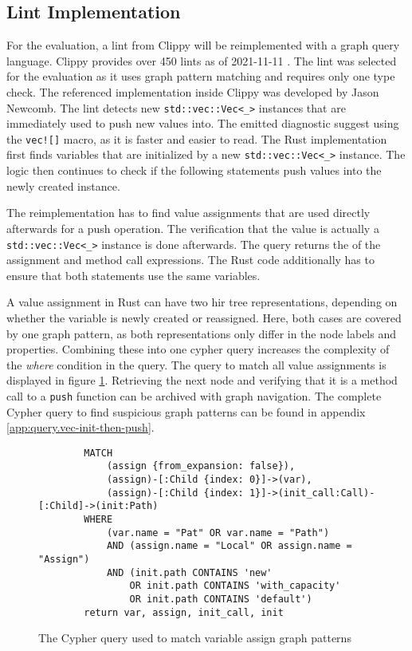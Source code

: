 \subsection{Lint Implementation} \label{sec:prot.lint-impl}

For the evaluation, a lint from Clippy will be reimplemented with a graph query language. Clippy provides over 450 lints as of 2021-11-11 \cite{clippy0000.readme}. The  lint was selected for the evaluation as it uses graph pattern matching and requires only one type check. The referenced implementation inside Clippy was developed by Jason Newcomb. The lint detects new \texttt{std::vec::Vec<\_>} instances that are immediately used to push new values into. The emitted diagnostic suggest using the \texttt{vec![]} macro, as it is faster and easier to read. The Rust implementation first finds variables that are initialized by a new \texttt{std::vec::Vec<\_>} instance. The logic then continues to check if the following statements push values into the newly created instance. \cite{clippy2021.6538}

The reimplementation has to find value assignments that are used directly afterwards for a push operation. The verification that the value is actually a \texttt{std::vec::Vec<\_>} instance is done afterwards. The query returns the  of the assignment and method call expressions. The Rust code additionally has to ensure that both statements use the same variables.

A value assignment in Rust can have two \acrshort{hir} tree representations, depending on whether the variable is newly created or reassigned. Here, both cases are covered by one graph pattern, as both representations only differ in the node labels and properties. Combining these into one cypher query increases the complexity of the \emph{where} condition in the query. The query to match all value assignments is displayed in figure \ref{fig:eval.impl.local}. Retrieving the next node and verifying that it is a method call to a \texttt{push} function can be archived with graph navigation. The complete Cypher query to find suspicious graph patterns can be found in appendix \ref{app:query.vec-init-then-push}.

\begin{figure}[H]
    \small
    \begin{verbatim}
        MATCH 
            (assign {from_expansion: false}),
            (assign)-[:Child {index: 0}]->(var),
            (assign)-[:Child {index: 1}]->(init_call:Call)-[:Child]->(init:Path) 
        WHERE 
            (var.name = "Pat" OR var.name = "Path")
            AND (assign.name = "Local" OR assign.name = "Assign")
            AND (init.path CONTAINS 'new' 
                OR init.path CONTAINS 'with_capacity'
                OR init.path CONTAINS 'default')
        return var, assign, init_call, init
    \end{verbatim}
    \caption[Cypher query: variable assignment]{The Cypher query used to match variable assign graph patterns}
    \label{fig:eval.impl.local}
\end{figure}

